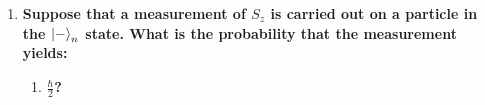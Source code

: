 \documentclass[11pt]{article}
\begin{document}
\begin{enumerate}[label=\textbf{\arabic*.}]
{\begin{enumerate}[label=\textbf{(\alph*)}]
{                    \begin{align*}
                        \cos\frac \theta 2&=\frac{1}{\sqrt 2} \\
                        \frac \theta 2&=\frac \pi 4 \\
                        \theta&=\frac \pi 2
                    \end{align*}
                    Then the second equation:
                    \begin{align*}
                        \sin\left(\frac \theta 2\right)e^{i\phi}&=\frac{1}{\sqrt 2} \\
                        \frac{1}{\sqrt 2}e^{i\phi}&=\frac{1}{\sqrt 2} \\
                        e^{i\phi}&=1 \\
                        \phi&=0
                    \end{align*}
                    So for \(\ket{+}_n\) to reduce to \(\ket{+}_x\), \(\theta\) must be \(\frac \pi 2\), and \(\phi\) must be 0.
                    \par
                    Next, \(\ket{+}_y\) was \(\frac{1}{\sqrt 2}(\ket{+}+i\ket{-})\), so for \(\ket{+}_n\) to equal \(\ket{+}_y\), we must set \[\cos\frac \theta 2=\frac{1}{\sqrt 2}\] and \[\sin\left(\frac \theta 2\right)e^{i\phi}=i\frac{1}{\sqrt 2}.\] The solution to the first equation we found earlier to be \(\theta=\frac \pi 2\). We then only have to solve the second equation:
                    \begin{align*}
                        \sin\left(\frac \theta 2\right)e^{i\phi}&=i\frac{1}{\sqrt 2} \\
                        \frac{1}{\sqrt 2}e^{i\phi}&=i\frac{1}{\sqrt 2} \\
                        e^{i\phi}&=i \\
                        \phi&=\frac \pi 2
                    \end{align*}
                    So for \(\ket{+}_n\) to reduce to \(\ket{+}_y\), both \(\theta\) and \(\phi\) must be \(\frac \pi 2\).
                }
                \item{
                    \textbf{\boldmath Suppose that a measurement of \(S_z\) is carried out on a particle in the \(\ket{-}_n\) state. What is the probability that the measurement yields:}
                    \begin{enumerate}[label=\textbf{(\roman*)}]
                        \item{
                            \textbf{\boldmath \(\frac \hbar 2\)?}
}
\end{enumerate}}
\end{enumerate}}
\end{enumerate}
\end{document}
